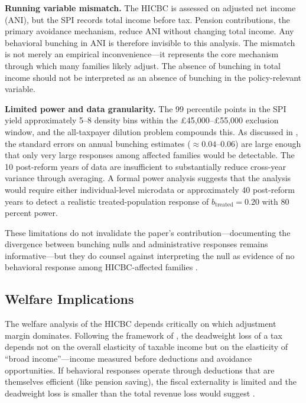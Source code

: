 \documentclass[12pt]{article}
\begin{document}
\textbf{Running variable mismatch.} The HICBC is assessed on adjusted net income (ANI), but the SPI records total income before tax. Pension contributions, the primary avoidance mechanism, reduce ANI without changing total income. Any behavioral bunching in ANI is therefore invisible to this analysis. The mismatch is not merely an empirical inconvenience---it represents the core mechanism through which many families likely adjust. The absence of bunching in total income should not be interpreted as an absence of bunching in the policy-relevant variable.

\textbf{Limited power and data granularity.} The 99 percentile points in the SPI yield approximately 5--8 density bins within the \pounds45,000--\pounds55,000 exclusion window, and the all-taxpayer dilution problem compounds this. As discussed in , the standard errors on annual bunching estimates (\(\approx 0.04\)--\(0.06\)) are large enough that only very large responses among affected families would be detectable. The 10 post-reform years of data are insufficient to substantially reduce cross-year variance through averaging. A formal power analysis suggests that the analysis would require either individual-level microdata or approximately 40 post-reform years to detect a realistic treated-population response of $b_{\text{treated}} = 0.20$ with 80 percent power.

These limitations do not invalidate the paper's contribution---documenting the divergence between bunching nulls and administrative responses remains informative---but they do counsel against interpreting the null as evidence of no behavioral response among HICBC-affected families \citep{chetty2012pp}.

\subsection{Welfare Implications}

The welfare analysis of the HICBC depends critically on which adjustment margin dominates. Following the framework of \citet{chetty2009}, the deadweight loss of a tax depends not on the overall elasticity of taxable income but on the elasticity of ``broad income''---income measured before deductions and avoidance opportunities. If behavioral responses operate through deductions that are themselves efficient (like pension saving), the fiscal externality is limited and the deadweight loss is smaller than the total revenue loss would suggest \citep{slemrod1996, saezslerodrz2012}.
\end{document}

